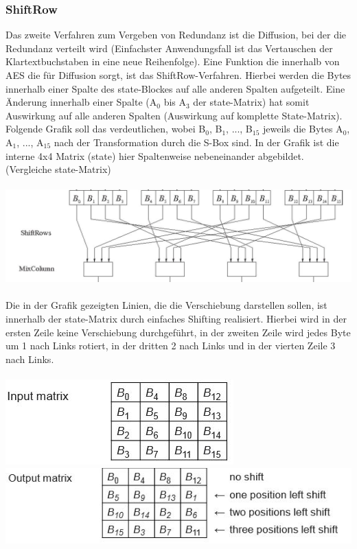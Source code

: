 \documentclass[10pt, a4paper,headsepline]{scrreprt}
\begin{document}
\subsubsection{ShiftRow}
Das zweite Verfahren zum Vergeben von Redundanz ist die Diffusion, bei der die Redundanz verteilt wird (Einfachster Anwendungsfall ist das Vertauschen der Klartextbuchstaben in eine neue Reihenfolge). Eine Funktion die innerhalb von AES die für Diffusion sorgt, ist das ShiftRow-Verfahren. Hierbei werden die Bytes innerhalb einer Spalte des state-Blockes auf alle anderen Spalten aufgeteilt. Eine Änderung innerhalb einer Spalte (A$_{0}$ bis A$_{3}$ der state-Matrix) hat somit Auswirkung auf alle anderen Spalten (Auswirkung auf komplette State-Matrix). Folgende Grafik soll das verdeutlichen, wobei B$_{0}$, B$_{1}$, ..., B$_{15}$ jeweils die Bytes A$_{0}$, A$_{1}$, ..., A$_{15}$ nach der Transformation durch die S-Box sind. In der Grafik ist die interne 4x4 Matrix (state) hier Spaltenweise nebeneinander abgebildet. (Vergleiche state-Matrix)  \\ \\%
\includegraphics[scale=0.5]{aes_Shift_Row.JPG} \\ \\
Die in der Grafik gezeigten Linien, die die Verschiebung darstellen sollen, ist innerhalb der state-Matrix durch einfaches Shifting realisiert. Hierbei wird in der ersten Zeile keine Verschiebung durchgeführt, in der zweiten Zeile wird jedes Byte um 1 nach Links rotiert, in der dritten 2 nach Links und in der vierten Zeile 3 nach Links. \\ \\
\includegraphics[scale=0.5]{shift_row_before.JPG}
\includegraphics[scale=0.5]{shift_row_after.JPG} \\
\end{document}
